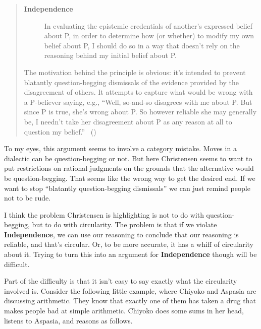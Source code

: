 \documentclass[
  10pt,
  letterpaper,
  twoside]{scrbook}
\begin{document}
\begin{quote}
\begin{description}
\item[\textbf{Independence}]
In evaluating the epistemic credentials of another's expressed belief
about P, in order to determine how (or whether) to modify my own belief
about P, I should do so in a way that doesn't rely on the reasoning
behind my initial belief about P.
\end{description}

The motivation behind the principle is obvious: it's intended to prevent
blatantly question-begging dismissals of the evidence provided by the
disagreement of others. It attempts to capture what would be wrong with
a P-believer saying, e.g., ``Well, so-and-so disagrees with me about P.
But since P is true, she's wrong about P. So however reliable she may
generally be, I needn't take her disagreement about P as any reason at
all to question my belief.''
~()
\end{quote}

To my eyes, this argument seems to involve a category mistake. Moves in
a dialectic can be question-begging or not. But here Christensen seems
to want to put restrictions on rational judgments on the grounds that
the alternative would be question-begging. That seems like the wrong way
to get the desired end. If we want to stop ``blatantly question-begging
dismissals'' we can just remind people not to be rude.

I think the problem Christensen is highlighting is not to do with
question-begging, but to do with circularity. The problem is that if we
violate \textbf{Independence}, we can use our reasoning to conclude that
our reasoning is reliable, and that's circular. Or, to be more accurate,
it has a whiff of circularity about it. Trying to turn this into an
argument for \textbf{Independence} though will be difficult.

Part of the difficulty is that it isn't easy to say exactly what the
circularity involved is. Consider the following little example, where
{Chiyoko} and {Aspasia} are discussing arithmetic. They know that
exactly one of them has taken a drug that makes people bad at simple
arithmetic. {Chiyoko} does some sums in her head, listens to {Aspasia},
and reasons as follows.
\end{document}

